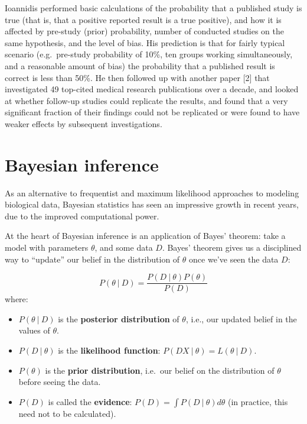 \documentclass[
  letterpaper,
  DIV=11,
  numbers=noendperiod]{scrreprt}
\providecommand{\tightlist}{%
  \setlength{\itemsep}{0pt}\setlength{\parskip}{0pt}}\usepackage{longtable,booktabs,array}
\begin{document}
Ioannidis performed basic calculations of the probability that a
published study is true (that is, that a positive reported result is a
true positive), and how it is affected by pre-study (prior) probability,
number of conducted studies on the same hypothesis, and the level of
bias. His prediction is that for fairly typical scenario (e.g.~pre-study
probability of 10\%, ten groups working simultaneously, and a reasonable
amount of bias) the probability that a published result is correct is
less than 50\%. He then followed up with another paper {[}2{]} that
investigated 49 top-cited medical research publications over a decade,
and looked at whether follow-up studies could replicate the results, and
found that a very significant fraction of their findings could not be
replicated or were found to have weaker effects by subsequent
investigations.

\hypertarget{bayesian-inference}{%
\section{Bayesian inference}\label{bayesian-inference}}

As an alternative to frequentist and maximum likelihood approaches to
modeling biological data, Bayesian statistics has seen an impressive
growth in recent years, due to the improved computational power.

At the heart of Bayesian inference is an application of Bayes' theorem:
take a model with parameters \(\theta\), and some data \(D\). Bayes'
theorem gives us a disciplined way to ``update'' our belief in the
distribution of \(\theta\) once we've seen the data \(D\):

\[
P(\theta \ \vert \ D) = \frac{P(D \ \vert \ \theta) P(\theta)}{P(D)}
\] where:

\begin{itemize}
\tightlist
\item
  \(P(\theta \ \vert \ D)\) is the \textbf{posterior distribution} of
  \(\theta\), i.e., our updated belief in the values of \(\theta\).
\item
  \(P(D \ \vert \ \theta)\) is the \textbf{likelihood function}:
  \(P(DX \ \vert \ \theta) = L(\theta \ \vert \ D)\).
\item
  \(P(\theta)\) is the \textbf{prior distribution}, i.e.~our belief on
  the distribution of \(\theta\) before seeing the data.
\item
  \(P(D)\) is called the \textbf{evidence}:
  \(P(D) = \int P(D \ \vert \ \theta) d \theta\) (in practice, this need
  not to be calculated).
\end{itemize}
\end{document}
